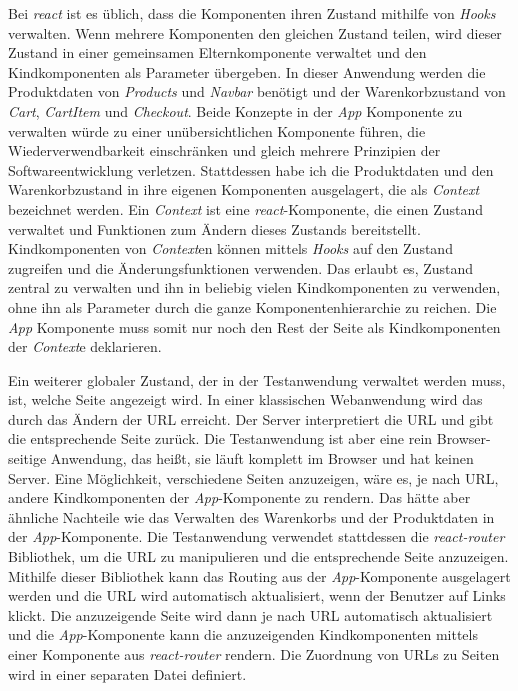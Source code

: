 Bei \textit{react} ist es üblich, dass die Komponenten ihren Zustand mithilfe von \textit{Hooks} verwalten.
Wenn mehrere Komponenten den gleichen Zustand teilen, wird dieser Zustand in einer gemeinsamen Elternkomponente verwaltet und den Kindkomponenten als Parameter übergeben.
In dieser Anwendung werden die Produktdaten von \textit{Products} und \textit{Navbar} benötigt und der Warenkorbzustand von \textit{Cart}, \textit{CartItem} und \textit{Checkout}.
Beide Konzepte in der \textit{App} Komponente zu verwalten würde zu einer unübersichtlichen Komponente führen, die Wiederverwendbarkeit einschränken und gleich mehrere Prinzipien der Softwareentwicklung verletzen.
Stattdessen habe ich die Produktdaten und den Warenkorbzustand in ihre eigenen Komponenten ausgelagert, die als \textit{Context} bezeichnet werden.
Ein \textit{Context} ist eine \textit{react}-Komponente, die einen Zustand verwaltet und Funktionen zum Ändern dieses Zustands bereitstellt.
Kindkomponenten von \textit{Context}en können mittels \textit{Hooks} auf den Zustand zugreifen und die Änderungsfunktionen verwenden.
Das erlaubt es, Zustand zentral zu verwalten und ihn in beliebig vielen Kindkomponenten zu verwenden, ohne ihn als Parameter durch die ganze Komponentenhierarchie zu reichen.
Die \textit{App} Komponente muss somit nur noch den Rest der Seite als Kindkomponenten der \textit{Context}e deklarieren.

Ein weiterer globaler Zustand, der in der Testanwendung verwaltet werden muss, ist, welche Seite angezeigt wird.
In einer klassischen Webanwendung wird das durch das Ändern der URL erreicht.
Der Server interpretiert die URL und gibt die entsprechende Seite zurück.
Die Testanwendung ist aber eine rein Browser-seitige Anwendung, das heißt, sie läuft komplett im Browser und hat keinen Server.
Eine Möglichkeit, verschiedene Seiten anzuzeigen, wäre es, je nach URL, andere Kindkomponenten der \textit{App}-Komponente zu rendern.
Das hätte aber ähnliche Nachteile wie das Verwalten des Warenkorbs und der Produktdaten in der \textit{App}-Komponente.
Die Testanwendung verwendet stattdessen die \textit{react-router} Bibliothek, um die URL zu manipulieren und die entsprechende Seite anzuzeigen.
Mithilfe dieser Bibliothek kann das Routing aus der \textit{App}-Komponente ausgelagert werden und die URL wird automatisch aktualisiert, wenn der Benutzer auf Links klickt.
Die anzuzeigende Seite wird dann je nach URL automatisch aktualisiert und die \textit{App}-Komponente kann die anzuzeigenden Kindkomponenten mittels einer Komponente aus \textit{react-router} rendern.
Die Zuordnung von URLs zu Seiten wird in einer separaten Datei definiert.

